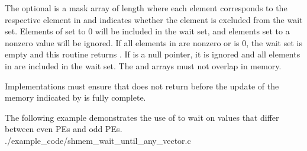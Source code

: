 \begin{apidefinition}
{    The optional  is a mask array of length  where each
    element corresponds to the respective element in  and indicates
    whether the element is excluded from the wait set.  Elements of
     set to 0 will be included in the wait set, and elements set to
    a nonzero value will be ignored.  If all elements in  are nonzero or
     is 0, the wait set is empty and this routine returns
    .  If  is a null pointer, it is ignored and
    all elements in  are included in the wait set.  The 
    and  arrays must not overlap in memory.

    Implementations must ensure that 
    does not return before the update of the memory indicated by  is
    fully complete.
}


\begin{apiexamples}
  \apicexample
      {The following \Cstd[11] example demonstrates the use of
       to wait on values that differ
      between even \acp{PE} and odd \acp{PE}.}
      {./example_code/shmem_wait_until_any_vector.c}
      {}
\end{apiexamples}

\end{apidefinition}
